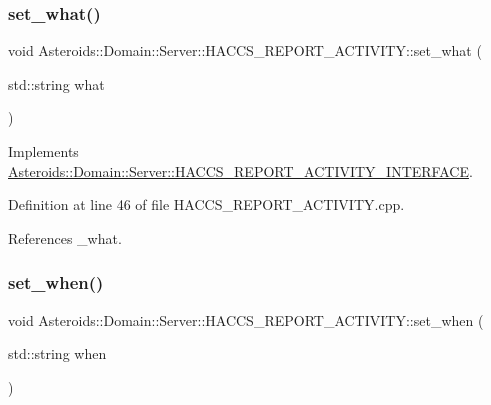 \subsubsection{\texorpdfstring{set\+\_\+what()}{set\_what()}}
{\footnotesize\ttfamily void Asteroids\+::\+Domain\+::\+Server\+::\+H\+A\+C\+C\+S\+\_\+\+R\+E\+P\+O\+R\+T\+\_\+\+A\+C\+T\+I\+V\+I\+T\+Y\+::set\+\_\+what (\begin{DoxyParamCaption}\item[{std\+::string}]{what }\end{DoxyParamCaption})\hspace{0.3cm}{\ttfamily [virtual]}}



Implements \hyperlink{classAsteroids_1_1Domain_1_1Server_1_1HACCS__REPORT__ACTIVITY__INTERFACE_ad481b664dbfaff34a9426a2192c708f3}{Asteroids\+::\+Domain\+::\+Server\+::\+H\+A\+C\+C\+S\+\_\+\+R\+E\+P\+O\+R\+T\+\_\+\+A\+C\+T\+I\+V\+I\+T\+Y\+\_\+\+I\+N\+T\+E\+R\+F\+A\+CE}.



Definition at line 46 of file H\+A\+C\+C\+S\+\_\+\+R\+E\+P\+O\+R\+T\+\_\+\+A\+C\+T\+I\+V\+I\+T\+Y.\+cpp.



References \+\_\+what.

\mbox{\label{classAsteroids_1_1Domain_1_1Server_1_1HACCS__REPORT__ACTIVITY_ae4f559ef148e51112899477c853dc806}} 
\subsubsection{\texorpdfstring{set\+\_\+when()}{set\_when()}}
{\footnotesize\ttfamily void Asteroids\+::\+Domain\+::\+Server\+::\+H\+A\+C\+C\+S\+\_\+\+R\+E\+P\+O\+R\+T\+\_\+\+A\+C\+T\+I\+V\+I\+T\+Y\+::set\+\_\+when (\begin{DoxyParamCaption}\item[{std\+::string}]{when }\end{DoxyParamCaption})\hspace{0.3cm}{\ttfamily [virtual]}}




